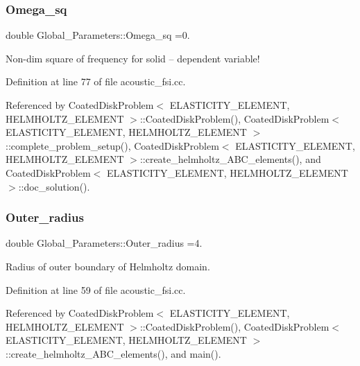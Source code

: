 \subsubsection{\texorpdfstring{Omega\+\_\+sq}{Omega\_sq}}
{\footnotesize\ttfamily double Global\+\_\+\+Parameters\+::\+Omega\+\_\+sq =0.}



Non-\/dim square of frequency for solid -- dependent variable! 



Definition at line 77 of file acoustic\+\_\+fsi.\+cc.



Referenced by Coated\+Disk\+Problem$<$ E\+L\+A\+S\+T\+I\+C\+I\+T\+Y\+\_\+\+E\+L\+E\+M\+E\+N\+T, H\+E\+L\+M\+H\+O\+L\+T\+Z\+\_\+\+E\+L\+E\+M\+E\+N\+T $>$\+::\+Coated\+Disk\+Problem(), Coated\+Disk\+Problem$<$ E\+L\+A\+S\+T\+I\+C\+I\+T\+Y\+\_\+\+E\+L\+E\+M\+E\+N\+T, H\+E\+L\+M\+H\+O\+L\+T\+Z\+\_\+\+E\+L\+E\+M\+E\+N\+T $>$\+::complete\+\_\+problem\+\_\+setup(), Coated\+Disk\+Problem$<$ E\+L\+A\+S\+T\+I\+C\+I\+T\+Y\+\_\+\+E\+L\+E\+M\+E\+N\+T, H\+E\+L\+M\+H\+O\+L\+T\+Z\+\_\+\+E\+L\+E\+M\+E\+N\+T $>$\+::create\+\_\+helmholtz\+\_\+\+A\+B\+C\+\_\+elements(), and Coated\+Disk\+Problem$<$ E\+L\+A\+S\+T\+I\+C\+I\+T\+Y\+\_\+\+E\+L\+E\+M\+E\+N\+T, H\+E\+L\+M\+H\+O\+L\+T\+Z\+\_\+\+E\+L\+E\+M\+E\+N\+T $>$\+::doc\+\_\+solution().

\mbox{\label{namespaceGlobal__Parameters_a88ded445ecd7bd89701409e68fd0b900}} 
\subsubsection{\texorpdfstring{Outer\+\_\+radius}{Outer\_radius}}
{\footnotesize\ttfamily double Global\+\_\+\+Parameters\+::\+Outer\+\_\+radius =4.}



Radius of outer boundary of Helmholtz domain. 



Definition at line 59 of file acoustic\+\_\+fsi.\+cc.



Referenced by Coated\+Disk\+Problem$<$ E\+L\+A\+S\+T\+I\+C\+I\+T\+Y\+\_\+\+E\+L\+E\+M\+E\+N\+T, H\+E\+L\+M\+H\+O\+L\+T\+Z\+\_\+\+E\+L\+E\+M\+E\+N\+T $>$\+::\+Coated\+Disk\+Problem(), Coated\+Disk\+Problem$<$ E\+L\+A\+S\+T\+I\+C\+I\+T\+Y\+\_\+\+E\+L\+E\+M\+E\+N\+T, H\+E\+L\+M\+H\+O\+L\+T\+Z\+\_\+\+E\+L\+E\+M\+E\+N\+T $>$\+::create\+\_\+helmholtz\+\_\+\+A\+B\+C\+\_\+elements(), and main().

